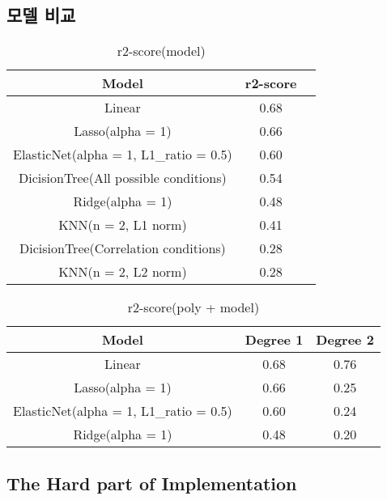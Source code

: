 \documentclass{article}
\begin{document}
\subsection{모델 비교}

\begin{table}[h]
    \centering
    \begin{tabular}{c|c|c}
        Model & r2-score \\ \hline
        Linear & 0.68 \\ 
        Lasso(alpha = 1) & 0.66\\
        ElasticNet(alpha = 1, L1_ratio = 0.5) & 0.60\\
        DicisionTree(All possible conditions) & 0.54 \\
        Ridge(alpha = 1) & 0.48\\
        KNN(n = 2, L1 norm) & 0.41 \\
        DicisionTree(Correlation conditions) & 0.28 \\
        KNN(n = 2, L2 norm) & 0.28
    \end{tabular}
    \caption{r2-score(model)}
    \label{tab:my_label}
\end{table}


\begin{table}[h]
    \centering
    \begin{tabular}{c|c|c}
        Model & Degree 1 & Degree 2 \\ \hline
        Linear & 0.68 & 0.76 \\ 
        Lasso(alpha = 1) & 0.66 & 0.25\\
        ElasticNet(alpha = 1, L1_ratio = 0.5) & 0.60 & 0.24\\
        Ridge(alpha = 1) & 0.48 & 0.20\\
    \end{tabular}
    \caption{r2-score(poly + model)}
    \label{tab:my_label}
\end{table}



\subsection{The Hard part of Implementation}
\end{document}
